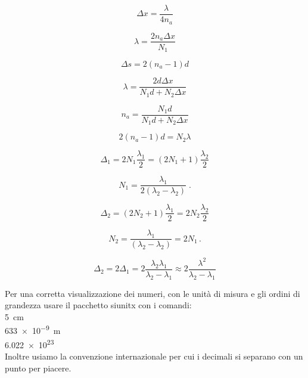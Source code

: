 \documentclass[a4paper,11pt]{article}
\begin{document}
	\label{interf} %
	\label{strum} %
	\label{calib} %
	
	\begin{equation}\label{delta}
	\Delta x = \dfrac{\lambda}{4n_a}
	\end{equation}
	
	\begin{equation}\label{lambdana}
	\lambda=\dfrac{2n_a\Delta x}{N_1}		
	\end{equation}
	
	\begin{equation}\label{deltavuoto}
	\Delta s = 2(n_a-1)d
	\end{equation}
	
	\begin{equation}\label{lambda}
	\lambda=\dfrac{2d\Delta x}{N_1 d + N_2 \Delta x}
	\end{equation}
	
	\begin{equation}\label{na}
	n_a=\dfrac{N_1 d}{N_1 d + N_2 \Delta x}
	\end{equation}
	
	\begin{equation}\label{indice_aria}
	2 (n_a - 1) d = N_2 \lambda
	\end{equation}
	
	\begin{equation}\label{delta1}
	\Delta_1=2N_1\frac{\lambda_1}{2}=(2N_1+1)\frac{\lambda_2}{2}
	\end{equation}
	
	\begin{equation}\label{N1}
	N_1=\dfrac{\lambda_1}{2\left(\lambda_2-\lambda_2\right)}\;.
	\end{equation}
	
	\begin{equation}\label{delta2}
	\Delta_2=(2N_2+1)\frac{\lambda_1}{2}=2N_2\frac{\lambda_2}{2}
	\end{equation}
	
	\begin{equation}\label{N2}
	N_2=\dfrac{\lambda_1}{\left(\lambda_2-\lambda_2\right)}=2N_1 \, .
	\end{equation}
	
	\begin{equation}\label{deltas}
	\Delta_2=2\Delta_1=2\dfrac{\lambda_2\lambda_1}{\lambda_2-\lambda_1}\approx2\dfrac{\lambda^2}{\lambda_2-\lambda_1}
	\end{equation}
	
	
	Per una corretta visualizzazione dei numeri, con le unità di misura e gli ordini di grandezza usare il pacchetto siunitx con i comandi:\\
	
		\SI{5}{\centi\meter}
	\\
		\SI{633e-9}{\meter}
	\\
		\num{6.022e23}
	\\
	Inoltre usiamo la convenzione internazionale per cui i decimali si separano con un punto per piacere.
	

	
\end{document}
